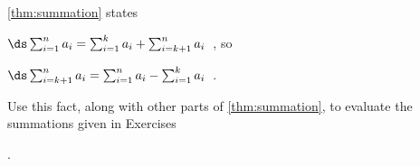 \begin{exerciseset}{\autoref{thm:summation} states

$\ds \sum_{i=1}^na_i = \sum_{i=1}^k a_i + \sum_{i=k+1}^n a_i$\ , so 

$\ds \sum_{i=k+1}^na_i = \sum_{i=1}^n a_i - \sum_{i=1}^k a_i$\ .

\noindent Use this fact, along with other parts of \autoref{thm:summation}, to evaluate the summations given in Exercises}{.}





\end{exerciseset}
